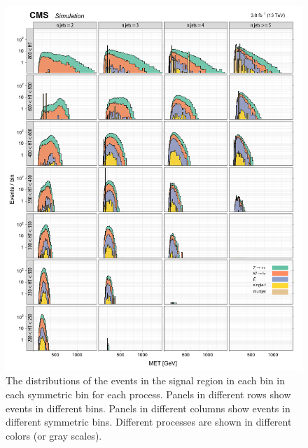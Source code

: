 \begin{figure}[!h]
\centering
\includegraphics[scale=0.95]{figures/kiplots/c150107_s150318_f015_MET_100}
\caption{The \met distributions of the events in the signal region in
each \scalht bin in each symmetric \njet bin for each process. Panels
in different rows show events in different \scalht bins. Panels in
different columns show events in different symmetric \njet bins.
Different processes are shown in different colors (or gray scales).}
\label{c150107_s150318_f015_MET_100}
\end{figure}

